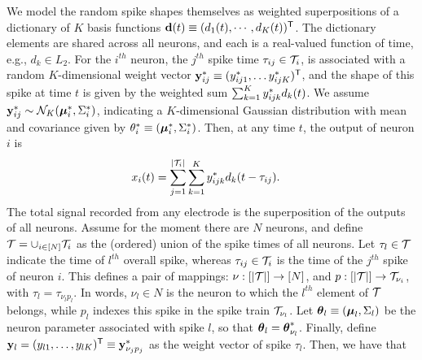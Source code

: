 We model the random spike shapes themselves as weighted superpositions of a dictionary of $K$ basis functions $\mathbf{d}(t) \equiv (d_1(t), \cdots, d_K(t))^{\mathsf{T}}$. The
dictionary elements are shared across all neurons, and each is a real-valued function of time, e.g., $d_k \in L_2$.
For the $i^{th}$ neuron, the $j^{th}$ spike time $\tau_{ij} \in \mathcal{T}_i$, is associated with a random $K$-dimensional weight vector $\mathbf{y}^*_{ij} \equiv (y^*_{ij1}, \ldots y^*_{ijK})^{\mathsf{T}}$, and the 
shape of this spike at time $t$ is given by the weighted sum $\sum_{k=1}^K y^*_{ijk} d_k(t)$. We assume $\mathbf{y}^*_{ij} \sim \mathcal{N}_K(\boldsymbol{\mu}^*_i, \Sigma^*_i)$, indicating a $K$-dimensional 
Gaussian distribution with mean and covariance given by $\theta^*_i \equiv (\boldsymbol{\mu}^*_i, \Sigma^*_i)$.   Then, at any time $t$, the output of neuron $i$ is
\begin{align}
  x_{i}(t) &= \sum_{j=1}^{|\mathcal{T}_i|} \sum_{k=1}^K y^*_{ijk} d_k(t - \tau_{ij}).
\end{align}
% 
% 
% 
% 
{The total signal recorded from any electrode  is the superposition of the outputs of all neurons. Assume for the moment there are $N$
neurons, and define $\mathcal{T} = \cup_{i \in [N]} \mathcal{T}_i$ as
the (ordered) union of the spike times of all neurons. 
Let $\tau_l \in \mathcal{T}$ indicate the time of $l^{th}$ overall spike, whereas $\tau_{ij} \in \mathcal{T}_i$ is the time of the $j^{th}$ spike of neuron $i$.
This defines a pair of mappings: $\nu:[|\mathcal{T}|]\rightarrow [N]$, and $p:[|\mathcal{T}|]\rightarrow \mathcal{T}_{\nu_i}$, with %
$\tau_l = \tau_{\nu_l p_l}$. 
In words, $\nu_l \in N$ is the neuron to which the $l^{th}$ element of $\mathcal{T}$ belongs, 
while $p_l$ indexes this spike in the spike train $\mathcal{T}_{\nu_l}$.
Let $\boldsymbol{\theta}_l \equiv (\boldsymbol{\mu}_l, \Sigma_l)$ be the neuron parameter associated with spike $l$, so that $\boldsymbol{\theta}_l = \boldsymbol{\theta}^*_{\nu_l}$. 
Finally, define $\mathbf{y}_l=(y_{l1}, \ldots, y_{lK})^{\mathsf{T}} \equiv \mathbf{y}^*_{\nu_j p_j}$ as the weight vector of spike $\tau_l$. Then, we have that}
